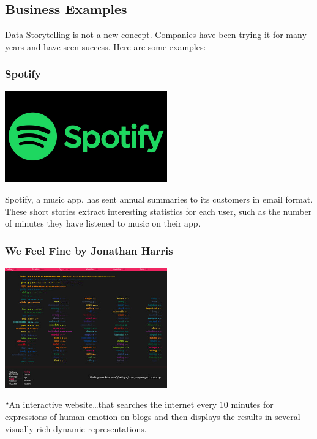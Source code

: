 \documentclass{article}
\begin{document}
\begin{multicols}{2}
\subsection{Business Examples}
Data Storytelling is not a new concept. Companies have been trying it for many years and have seen success. Here are some examples:
\subsubsection{Spotify}
\begin{center}
	\includegraphics[width=7cm]{./images/5.jpg} 
\end{center}
Spotify, a music app, has sent annual summaries to its customers in email format. These short stories extract interesting statistics for each user, such as the number of minutes they have listened to music on their app.

\subsubsection{We Feel Fine by Jonathan Harris}
\begin{center}
	\includegraphics[width=7cm]{./images/4.jpeg} 
\end{center}
“An interactive website…that searches the internet every 10 minutes for expressions of human emotion on blogs and then displays the results in several visually-rich dynamic representations.


\end{multicols}
\end{document}
